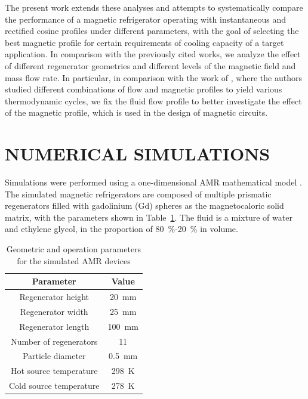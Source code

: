 \documentclass[draft]{svjour3}
\begin{document}
The present work extends these analyses and attempts to systematically compare the performance of a magnetic refrigerator operating with instantaneous and  rectified cosine profiles under different parameters, with the goal of selecting the best magnetic profile for certain requirements of cooling capacity of a target application. In comparison with the previously cited works, we analyze the effect of different regenerator geometries and different levels of the magnetic field and mass flow rate. In particular, in comparison with the work of \cite{bib:kitanovski}, where the authors studied different combinations of flow and magnetic profiles to yield various thermodynamic cycles, we fix the fluid flow profile to better investigate the effect of the magnetic profile, which is used in the design of magnetic circuits.

\section{NUMERICAL SIMULATIONS}
\label{sec:numer-simul}

Simulations were performed using a one-dimensional AMR mathematical model \cite{bib:asme-mce,bib:trevizoli16_perfor_model}. The simulated magnetic refrigerators are composed of multiple prismatic regenerators filled with gadolinium (Gd) spheres as the magnetocaloric solid matrix, with the parameters shown in Table~\ref{tab:params}. The fluid is a mixture of water and ethylene glycol, in the proportion of \SI{80}{\percent}-\SI{20}{\percent} in volume.

\begin{table}[!ht]
  \centering
  \caption{Geometric and operation parameters for the simulated AMR devices}
  \begin{tabular}{c|c}
\hline
    \textbf{Parameter}&\textbf{Value}\\
\hline
Regenerator height & \SI{20}{\mm}\\
Regenerator width & \SI{25}{\mm}\\
Regenerator length & \SI{100}{\mm}\\
Number of regenerators & \num{11} \\
Particle diameter & \SI{0.5}{\mm}\\
Hot source temperature & \SI{298}{\kelvin}\\
Cold source temperature & \SI{278}{\kelvin}\\
\hline
  \end{tabular}
  \label{tab:params}
\end{table}
\end{document}
